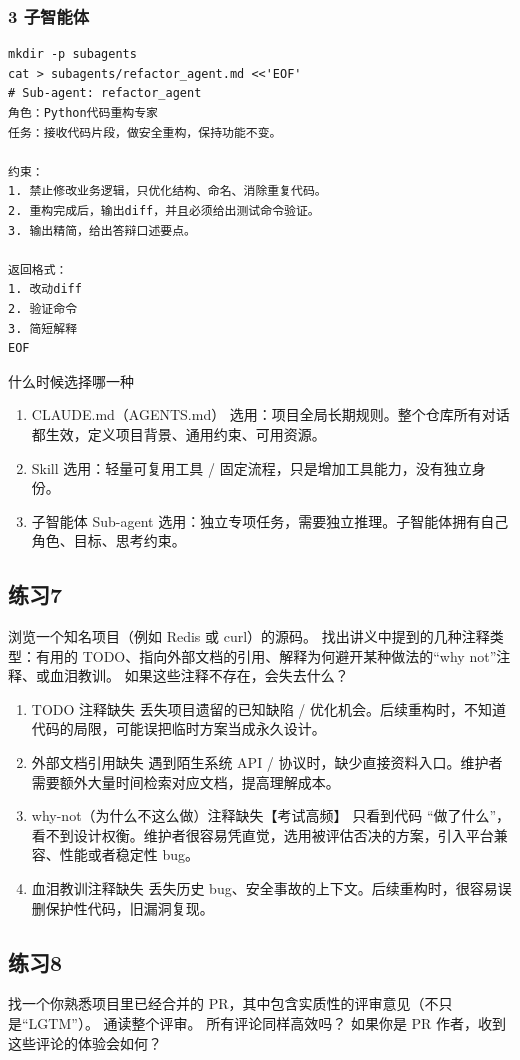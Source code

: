 \documentclass[11pt,a4paper]{ctexart}
\begin{document}
\subsubsection*{3 子智能体}
\begin{lstlisting}
mkdir -p subagents
cat > subagents/refactor_agent.md <<'EOF'
# Sub-agent: refactor_agent
角色：Python代码重构专家
任务：接收代码片段，做安全重构，保持功能不变。

约束：
1. 禁止修改业务逻辑，只优化结构、命名、消除重复代码。
2. 重构完成后，输出diff，并且必须给出测试命令验证。
3. 输出精简，给出答辩口述要点。

返回格式：
1. 改动diff
2. 验证命令
3. 简短解释
EOF
\end{lstlisting}

什么时候选择哪一种
\begin{enumerate}[label=\arabic*.]
\item CLAUDE.md（AGENTS.md） 选用：项目全局长期规则。整个仓库所有对话都生效，定义项目背景、通用约束、可用资源。
\item Skill 选用：轻量可复用工具 / 固定流程，只是增加工具能力，没有独立身份。
\item 子智能体 Sub-agent 选用：独立专项任务，需要独立推理。子智能体拥有自己角色、目标、思考约束。
\end{enumerate}

\subsection*{练习7}
浏览一个知名项目（例如 Redis 或 curl）的源码。 找出讲义中提到的几种注释类型：有用的 TODO、指向外部文档的引用、解释为何避开某种做法的“why not”注释、或血泪教训。 如果这些注释不存在，会失去什么？
\begin{enumerate}[label=\arabic*.]
\item TODO 注释缺失 丢失项目遗留的已知缺陷 / 优化机会。后续重构时，不知道代码的局限，可能误把临时方案当成永久设计。
\item 外部文档引用缺失 遇到陌生系统 API / 协议时，缺少直接资料入口。维护者需要额外大量时间检索对应文档，提高理解成本。
\item why-not（为什么不这么做）注释缺失【考试高频】 只看到代码 “做了什么”，看不到设计权衡。维护者很容易凭直觉，选用被评估否决的方案，引入平台兼容、性能或者稳定性 bug。
\item 血泪教训注释缺失 丢失历史 bug、安全事故的上下文。后续重构时，很容易误删保护性代码，旧漏洞复现。
\end{enumerate}

\subsection*{练习8}
找一个你熟悉项目里已经合并的 PR，其中包含实质性的评审意见（不只是“LGTM”）。 通读整个评审。 所有评论同样高效吗？ 如果你是 PR 作者，收到这些评论的体验会如何？
\end{document}
